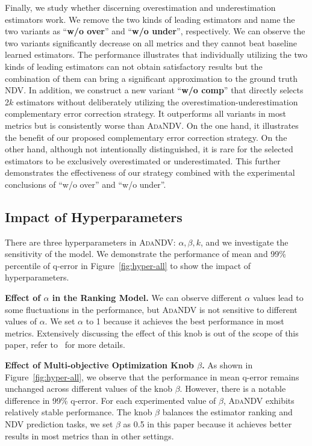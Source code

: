 Finally, we study whether discerning overestimation and underestimation estimators work. 
We remove the two kinds of leading estimators and name the two variants as ``\textbf{{w/o} over}'' and ``\textbf{{w/o} under}'', respectively. 
We can observe the two variants significantly decrease on all metrics and they cannot beat baseline learned estimators. 
The performance illustrates that individually utilizing the two kinds of leading estimators can not obtain satisfactory results but the combination of them can bring a significant approximation to the ground truth NDV. In addition, we construct a new variant ``\textbf{{w/o} comp}'' that directly selects {2$k$} estimators without deliberately utilizing the overestimation-underestimation complementary error correction strategy. It outperforms all variants in most metrics but is consistently worse than \textsc{AdaNDV}. On the one hand, it illustrates the benefit of our proposed complementary error correction strategy. On the other hand, although not intentionally distinguished, it is rare for the selected estimators to be exclusively overestimated or underestimated. This further demonstrates the effectiveness of our strategy combined with the experimental conclusions of ``{w/o} over'' and ``{w/o} under''.







\subsection{Impact of Hyperparameters}
\label{sec:exp-hyperparameter}
There are three hyperparameters in \textsc{AdaNDV}: $\alpha, \beta, k$, and we investigate the sensitivity of the model. We demonstrate the performance of mean and 99\% percentile of q-error in Figure~\ref{fig:hyper-all} to show the impact of hyperparameters.

\noindent\textbf{Effect of $\alpha$ in the Ranking Model.} We can observe different $\alpha$ values lead to some fluctuations in the performance, but \textsc{AdaNDV} is not sensitive to different values of $\alpha$. We set $\alpha$ to 1 because it achieves the best performance in most metrics.
Extensively discussing the effect of this knob is out of the scope of this paper, refer to~\cite{bruch2019revisiting,wang2018lambdaloss} for more details.

\noindent\textbf{Effect of Multi-objective Optimization Knob $\beta$.} As shown in Figure~\ref{fig:hyper-all}, we observe that the performance in mean q-error remains unchanged across different values of the knob $\beta$. However, there is a notable difference in 99\% q-error. For each experimented value of $\beta$, \textsc{AdaNDV} exhibits relatively stable performance. The knob $\beta$ balances the estimator ranking and NDV prediction tasks, we set $\beta$ as 0.5 in this paper because it achieves better results in most metrics than in other settings.



